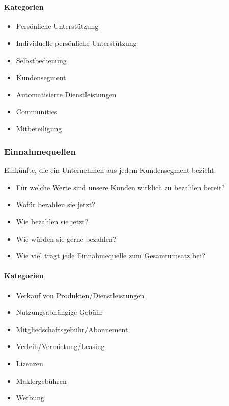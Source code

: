 \paragraph{Kategorien}
\begin{multicols}{3}
	\begin{itemize}
		\item Persönliche Unterstützung 
		\item Individuelle persönliche 	Unterstützung 
		\item Selbstbedienung 
		\item Kundensegment
		\item Automatisierte Dienstleistungen 
		\item Communities
		\item Mitbeteiligung
	\end{itemize}
\end{multicols}

\subsubsection{Einnahmequellen}
Einkünfte, die ein Unternehmen aus jedem Kundensegment bezieht.
\begin{itemize}
	\item Für welche Werte sind unsere Kunden wirklich zu bezahlen bereit?
	\item Wofür bezahlen sie jetzt?
	\item Wie bezahlen sie jetzt?
	\item Wie würden sie gerne bezahlen?
	\item Wie viel trägt jede Einnahmequelle zum Gesamtumsatz bei?
\end{itemize}

\paragraph{Kategorien}
\begin{multicols}{3}
	\begin{itemize}
		\item Verkauf von Produkten/Dienstleistungen 
		\item Nutzungsabhängige Gebühr 
		\item Mitgliedschaftsgebühr/Abonnement 
		\item Verleih/Vermietung/Leasing
		\item Lizenzen
		\item Maklergebühren
		\item Werbung
	\end{itemize}
\end{multicols}

